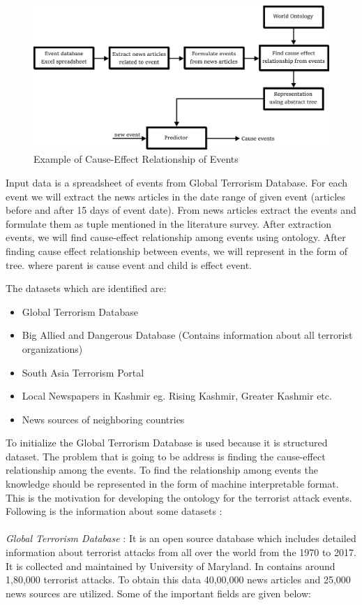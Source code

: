 \documentclass[journal,onecolumn,11pt]{IEEEtran}
\begin{document}
\begin{figure}[h!]
    \centering    
    \includegraphics[scale=0.8]{architec.png}
    \caption{Example of Cause-Effect Relationship of Events}
\end{figure}

Input data is a spreadsheet of events from Global Terrorism Database. For each event we will extract the news articles in the date range of given event (articles before and after 15 days of event date). From news articles extract the events and formulate them as tuple mentioned in the literature survey. After extraction events, we will find cause-effect relationship among events using ontology. After finding cause effect relationship between events, we will represent in the form of tree. where parent is cause event and child is effect event.     

The datasets which are identified are:
\begin{itemize}
\item Global Terrorism Database
\item Big Allied and Dangerous Database (Contains information about all terrorist organizations)
\item South Asia Terrorism Portal
\item Local Newspapers in Kashmir eg. Rising Kashmir, Greater Kashmir etc.
\item News sources of neighboring countries
\end{itemize}

To initialize the Global Terrorism Database is used because it is structured dataset. The problem that is going to be address is finding the cause-effect relationship among the events. To find the relationship among events the knowledge should be represented in the form of machine interpretable format. This is the motivation for developing the ontology for the terrorist attack events. Following is the information about some datasets :\\ \\
\textit{Global Terrorism Database} : It is an open source database which includes detailed information about terrorist attacks from all over the world from the 1970 to 2017. It is collected and maintained by University of Maryland. In contains around 1,80,000 terrorist attacks. To obtain this data 40,00,000 news articles and 25,000 news sources are utilized. Some of the important fields are given below: \cite{gtd} \cite{gtd codebook}\\
\end{document}
